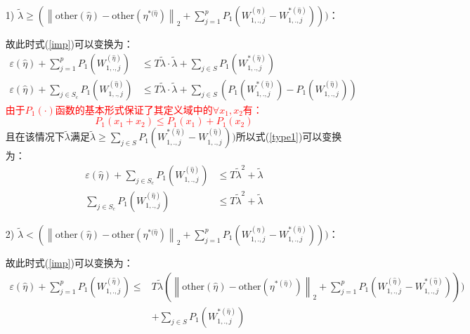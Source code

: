 \documentclass{article}
\begin{document}
\begin{itemize}
	\item [1)]$\tilde{\lambda}\geq(\left\|\text{other}(\hat{\eta})-\text{other}(\eta^{*(\hat{\eta}})\right\|_2+\sum_{j=1}^pP_1(W_{1,.,j}^{(\hat{\eta})}-W_{1,.,j}^{*(\hat{\eta})})))$：
	\par 故此时式(\ref*{imp})可以变换为：
	\begin{equation}
		\begin{split}\label{type1}
			\varepsilon(\hat{\eta})+\sum^p_{j=1}P_1(W_{1,.,j}^{(\hat{\eta})})&\leq T\tilde{\lambda}\cdot\tilde{\lambda}+\sum_{j\in S} P_1(W_{1,.,j}^{*(\hat{\eta})})\\
			\varepsilon(\hat{\eta})+\sum_{j\in S_c}P_1(W_{1,.,j}^{(\hat{\eta})})&\leq T\tilde{\lambda}\cdot\tilde{\lambda}+\sum_{j\in S} (P_1(W_{1,.,j}^{*(\hat{\eta})})-P_1(W_{1,.,j}^{(\hat{\eta})}))
		\end{split}
	\end{equation}
	\textcolor{red}{由于$P_1(\cdot)$函数的基本形式保证了其定义域中的$\forall x_1,x_2$有：
	\begin{equation}\label{inequilty}
		P_1(x_1+x_2)\leq P_1(x_1)+P_1(x_2)
	\end{equation}}
	且在该情况下$\tilde{\lambda}$满足$\tilde{\lambda}\geq\sum_{j\in S}P_1(W_{1,.,j}^{*(\hat{\eta})}-W_{1,.,j}^{(\hat{\eta})}))$所以式(\ref*{type1})可以变换为：
	\begin{equation}
		\begin{split}
		\varepsilon(\hat{\eta})+\sum_{j\in S_c}P_1(W_{1,.,j}^{(\hat{\eta})})&\leq T\tilde{\lambda}^2+\tilde{\lambda}\\
		    \sum_{j\in S_c}P_1(W_{1,.,j}^{(\hat{\eta})})&\leq T\tilde{\lambda}^2+\tilde{\lambda}
		\end{split}
	\end{equation}
	\item [2)]$\tilde{\lambda}<(\left\|\text{other}(\hat{\eta})-\text{other}(\eta^{*(\hat{\eta}})\right\|_2+\sum_{j=1}^pP_1(W_{1,.,j}^{(\hat{\eta})}-W_{1,.,j}^{*(\hat{\eta})})))$：
	\par 故此时式(\ref*{imp})可以变换为：
	\begin{equation}
		\begin{split}\label{type2}
			\varepsilon(\hat{\eta})+\sum^p_{j=1}P_1(W_{1,.,j}^{(\hat{\eta})})\leq &T\tilde{\lambda}(\left\|\text{other}(\hat{\eta})-\text{other}(\eta^{*(\hat{\eta})})\right\|_2+\sum_{j=1}^pP_1(W_{1,.,j}^{(\hat{\eta})}-W_{1,.,j}^{*(\hat{\eta})})))\\&+\sum_{j\in S}P_1(W_{1,.,j}^{*(\hat{\eta})})

\end{split}
\end{equation}
\end{itemize}
\end{document}
